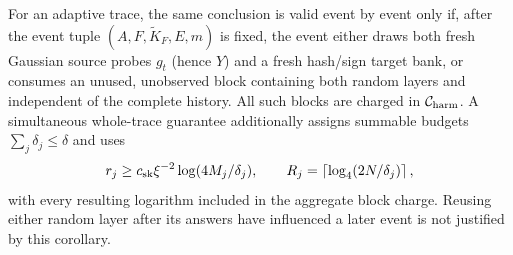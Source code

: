 \begin{corollary}
For an adaptive trace, the same conclusion is valid event by event only if,
after the event tuple $(A,F,\widetilde K_F,E,m)$ is fixed, the event either
draws both fresh Gaussian source probes $g_t$ (hence $Y$) and a fresh
hash/sign target bank, or consumes an unused, unobserved block containing both
random layers and independent of the complete history.  All such blocks are
charged in $\mathcal C_{\rm harm}$.  A simultaneous whole-trace guarantee
additionally assigns summable budgets $\sum_j\delta_j\leq\delta$ and uses
\begin{equation*}
 r_j\geq c_{\rm sk}\xi^{-2}\log(4M_j/\delta_j),
 \qquad
 R_j=\left\lceil\log_4(2N/\delta_j)\right\rceil,
\end{equation*}
with every resulting logarithm included in the aggregate block charge.
Reusing either random layer after its answers have influenced a later event is
not justified by this corollary.
\end{corollary}

